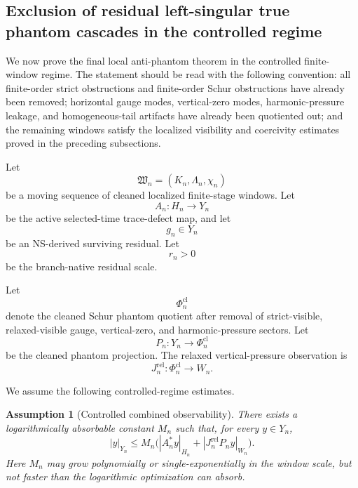 \documentclass[11pt]{article}
\numberwithin{equation}{section}
\newtheorem{assumption}[theorem]{Assumption}
\begin{document}
\subsection{Exclusion of residual left-singular true phantom cascades in the controlled regime}

We now prove the final local anti-phantom theorem in the controlled finite-window regime. The statement should be read with the following convention: all finite-order strict obstructions and finite-order Schur obstructions have already been removed; horizontal gauge modes, vertical-zero modes, harmonic-pressure leakage, and homogeneous-tail artifacts have already been quotiented out; and the remaining windows satisfy the localized visibility and coercivity estimates proved in the preceding subsections.

Let
\[
\mathfrak W_n=(K_n,\Lambda_n,\chi_n)
\]
be a moving sequence of cleaned localized finite-stage windows. Let
\[
A_n:H_n\to Y_n
\]
be the active selected-time trace-defect map, and let
\[
g_n\in Y_n
\]
be an NS-derived surviving residual. Let
\[
r_n>0
\]
be the branch-native residual scale.

Let
\[
\Phi_n^{\mathrm{cl}}
\]
denote the cleaned Schur phantom quotient after removal of strict-visible, relaxed-visible gauge, vertical-zero, and harmonic-pressure sectors. Let
\[
P_n:Y_n\to \Phi_n^{\mathrm{cl}}
\]
be the cleaned phantom projection. The relaxed vertical-pressure observation is
\[
J_n^{\mathrm{rel}}:\Phi_n^{\mathrm{cl}}\to W_n.
\]

We assume the following controlled-regime estimates.

\begin{assumption}[Controlled combined observability]
There exists a logarithmically absorbable constant \(M_n\) such that, for every \(y\in Y_n\),
\begin{equation}
|y|_{Y_n}
\le
M_n\Big(
|A_n^*y|_{H_n}
+
|J_n^{\mathrm{rel}}P_n y|_{W_n}
\Big).
\label{eq:tag-10-246}
\end{equation}
Here \(M_n\) may grow polynomially or single-exponentially in the window scale, but not faster than the logarithmic optimization can absorb.
\end{assumption}
\end{document}
